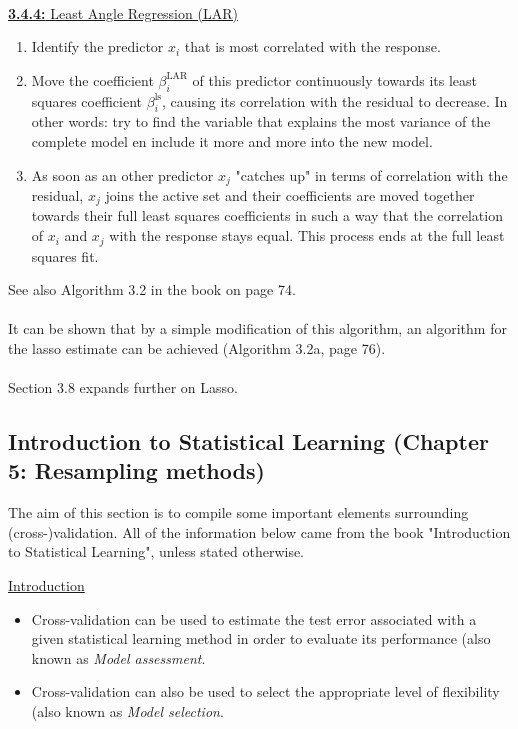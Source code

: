 \\
\underline{\textbf{3.4.4:} Least Angle Regression (LAR)}
\begin{enumerate}
    \item Identify the predictor $x_i$ that is most correlated with the response.
    \item Move the coefficient $\beta_i^{\textrm{LAR}}$ of this predictor continuously towards its least squares coefficient $\beta_i^{\textrm{ls}}$, causing its correlation with the residual to decrease. In other words: try to find the variable that explains the most variance of the complete model en include it more and more into the new model.
    \item As soon as an other predictor $x_j$ "catches up" in terms of correlation with the residual, $x_j$ joins the active set and their coefficients are moved together towards their full least squares coefficients in such a way that the correlation of $x_i$ and $x_j$ with the response stays equal. This process ends at the full least squares fit.
\end{enumerate}
See also Algorithm 3.2 in the book on page 74.\\
\\
It can be shown that by a simple modification of this algorithm, an algorithm for the lasso estimate can be achieved (Algorithm 3.2a, page 76).\\
\\
Section 3.8 expands further on Lasso.


\subsection*{Introduction to Statistical Learning (Chapter 5: Resampling methods)}
The aim of this section is to compile some important elements surrounding (cross-)validation. All of the information below came from the book "Introduction to Statistical Learning", unless stated otherwise.

\underline{Introduction}
\begin{itemize}
    \item Cross-validation can be used to estimate the test error associated with a given statistical learning method in order to evaluate its performance (also known as \textit{Model assessment}.
    \item Cross-validation can also be used to select the appropriate level of flexibility (also known as \textit{Model selection}.
\end{itemize}

